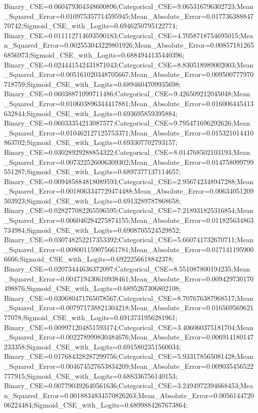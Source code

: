 Binary_CSE=0.060479304348600896;Categorical_CSE=9.065316796302723;Mean_Squared_Error=0.010975357714595945;Mean_Absolute_Error=0.01773638884770742;Sigmoid_CSE_with_Logits=0.6946250795122774;
Binary_CSE=0.011112714693590183;Categorical_CSE=4.7058718754695015;Mean_Squared_Error=0.002553043229801926;Mean_Absolute_Error=0.008571812656856973;Sigmoid_CSE_with_Logits=0.6884944135440396;
Binary_CSE=0.024441542431871043;Categorical_CSE=8.830518989002003;Mean_Squared_Error=0.005161020348705667;Mean_Absolute_Error=0.009500777970718759;Sigmoid_CSE_with_Logits=0.6894604709935698;
Binary_CSE=0.06038871099711486;Categorical_CSE=9.426509212045048;Mean_Squared_Error=0.010603896344417881;Mean_Absolute_Error=0.016006445413632844;Sigmoid_CSE_with_Logits=0.693695859395884;
Binary_CSE=0.06033354213087577;Categorical_CSE=9.795471696292626;Mean_Squared_Error=0.010462127125753371;Mean_Absolute_Error=0.015321014410863702;Sigmoid_CSE_with_Logits=0.693307702793157;
Binary_CSE=0.03028929288854322;Categorical_CSE=8.014768502103193;Mean_Squared_Error=0.007322526006309302;Mean_Absolute_Error=0.014758099799551287;Sigmoid_CSE_with_Logits=0.6897377137114657;
Binary_CSE=0.009485884818089593;Categorical_CSE=2.956742348947288;Mean_Squared_Error=0.0018063347729474488;Mean_Absolute_Error=0.00634051209503923;Sigmoid_CSE_with_Logits=0.6913289787868658;
Binary_CSE=0.028277082265596595;Categorical_CSE=7.218931825316854;Mean_Squared_Error=0.006046284275874155;Mean_Absolute_Error=0.011825634863734984;Sigmoid_CSE_with_Logits=0.6908705524529852;
Binary_CSE=0.030748252217353392;Categorical_CSE=5.660741732670711;Mean_Squared_Error=0.008001159075661781;Mean_Absolute_Error=0.0171411959006666;Sigmoid_CSE_with_Logits=0.6922256618842378;
Binary_CSE=0.02073444636372097;Categorical_CSE=8.551087800194235;Mean_Squared_Error=0.004719430610938461;Mean_Absolute_Error=0.009429730170498876;Sigmoid_CSE_with_Logits=0.6895267306802108;
Binary_CSE=0.030680471765078567;Categorical_CSE=8.707676387968517;Mean_Squared_Error=0.007971738821304218;Mean_Absolute_Error=0.01656956962177078;Sigmoid_CSE_with_Logits=0.6913731956281961;
Binary_CSE=0.009971204851593174;Categorical_CSE=3.406060375181704;Mean_Squared_Error=0.002278999830484676;Mean_Absolute_Error=0.006914180147233358;Sigmoid_CSE_with_Logits=0.6915802351560034;
Binary_CSE=0.017684328287299756;Categorical_CSE=5.933178565081428;Mean_Squared_Error=0.004674527653834209;Mean_Absolute_Error=0.009035456522777915;Sigmoid_CSE_with_Logits=0.688336756140153;
Binary_CSE=0.007790392640561636;Categorical_CSE=3.2494972394668453;Mean_Squared_Error=0.0018834834570826263;Mean_Absolute_Error=0.005614472006224484;Sigmoid_CSE_with_Logits=0.6899884267673864;
